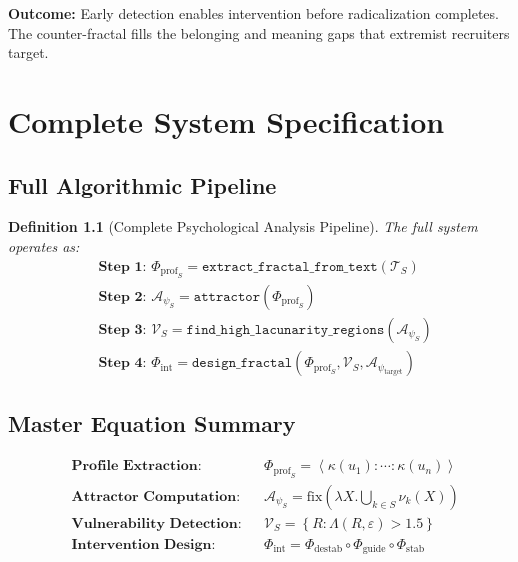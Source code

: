 \documentclass[11pt,twoside]{book}
\newcommand{\noe}[1]{\nu_{#1}}
\newcommand{\Frac}{\Phi}
\newcommand{\fix}{\mathrm{fix}}
\newcommand{\Lacunarity}{\Lambda}
\newcommand{\PsychAttractor}{\mathcal{A}_\psi}
\newcommand{\ManipFrac}{\Phi_{\mathrm{int}}}
\newcommand{\ProfileFrac}{\Phi_{\mathrm{prof}}}
\newcommand{\VulnSet}{\mathcal{V}}
\newcommand{\TextCorpus}{\mathcal{T}}
\newtheorem{definition}{Definition}[chapter]
\begin{document}
\begin{tcolorbox}[colback=yellow!5!white,colframe=yellow!65!black,title=\textbf{Scenario 4: Security Application --- Radicalization Detection},breakable]
\textbf{Outcome:}
Early detection enables intervention before radicalization completes. The counter-fractal
fills the belonging and meaning gaps that extremist recruiters target.

\end{tcolorbox}

\chapter{Complete System Specification}
\label{ch:system-spec}

\section{Full Algorithmic Pipeline}

\begin{definition}[Complete Psychological Analysis Pipeline]
\label{def:complete-pipeline}
The full system operates as:
\begin{align}
    &\textbf{Step 1: } \ProfileFrac_S = \texttt{extract\_fractal\_from\_text}(\TextCorpus_S) \\
    &\textbf{Step 2: } \PsychAttractor_S = \texttt{attractor}(\ProfileFrac_S) \\
    &\textbf{Step 3: } \VulnSet_S = \texttt{find\_high\_lacunarity\_regions}(\PsychAttractor_S) \\
    &\textbf{Step 4: } \ManipFrac = \texttt{design\_fractal}(\ProfileFrac_S, \VulnSet_S, \PsychAttractor_{\mathrm{target}})
\end{align}
\end{definition}

\section{Master Equation Summary}

\begin{equation}
\boxed{
\begin{aligned}
    &\textbf{Profile Extraction:} && \ProfileFrac_S = \left\langle \kappa(u_1) : \cdots : \kappa(u_n) \right\rangle \\[0.5em]
    &\textbf{Attractor Computation:} && \PsychAttractor_S = \fix\left(\lambda X. \bigcup_{k \in S} \noe{k}(X)\right) \\[0.5em]
    &\textbf{Vulnerability Detection:} && \VulnSet_S = \left\{ R : \Lacunarity(R, \varepsilon) > 1.5 \right\} \\[0.5em]
    &\textbf{Intervention Design:} && \ManipFrac = \Frac_{\mathrm{destab}} \circ \Frac_{\mathrm{guide}} \circ \Frac_{\mathrm{stab}}
\end{aligned}
}
\end{equation}
\end{document}
